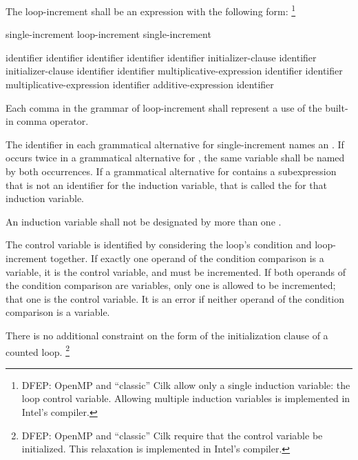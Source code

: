 The loop-increment shall be an expression with the following form:%
\footnote{DFEP:
OpenMP and ``classic'' Cilk allow only a single induction variable:
the loop control variable.
Allowing multiple induction variables is implemented in Intel's compiler.
}

\begin{bnf}
\br
single-increment
\br
loop-increment \terminal{,} single-increment
\end{bnf}

\begin{bnf}
\br
identifier \terminal{++}
\br
identifier \terminal{--}
\br
\terminal{++} identifier
\br
\terminal{--} identifier
\br
identifier \terminal{+=} initializer-clause
\br
identifier \terminal{-=} initializer-clause
\br
identifier \terminal{=} identifier \terminal{+} multiplicative-expression
\br
identifier \terminal{=} identifier \terminal{-} multiplicative-expression
\br
identifier \terminal{=} additive-expression \terminal{+} identifier
\end{bnf}

\begin{cpp}
Each comma in the grammar of loop-increment shall represent
a use of the built-in comma operator.
\end{cpp}
The identifier in each grammatical alternative for single-increment
names an
.
If
occurs twice in a grammatical alternative for
,
the same variable shall be named by both occurrences.
If a grammatical alternative for
contains a subexpression
that is not an identifier for the induction variable,
that is called the
for that induction variable.

An induction variable shall not be designated by more than one
.

\begin{note}
The control variable is identified by considering
the loop's condition and loop-increment together.
If exactly one operand of the condition comparison is a variable,
it is the control variable, and must be incremented.
If both operands of the condition comparison are variables,
only one is allowed to be incremented;
that one is the control variable.
It is an error if neither operand of the condition comparison is a variable.
\end{note}

\begin{note}
There is no additional constraint on the form
of the initialization clause of a counted  loop.%
\footnote{DFEP:
OpenMP and ``classic'' Cilk require that the control variable be initialized.
This relaxation is implemented in Intel's compiler.
}
\end{note}

